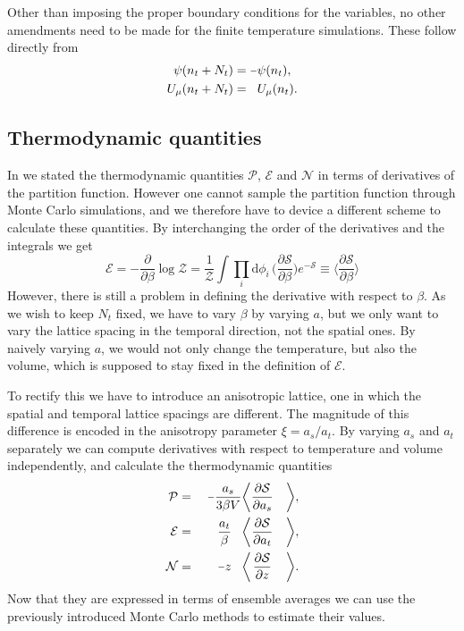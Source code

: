 Other than imposing the proper boundary conditions for the variables, no other
amendments need to be made for the finite temperature simulations. These follow
directly from 
%
\begin{align}
  \psi(n_t + N_t) &= \minus \psi(n_t), \\
  U_{\mu}(n_t + N_t) &= \hphantom{\minus} U_{\mu}(n_t).
\end{align}

\subsection{Thermodynamic quantities}

In  we stated the thermodynamic quantities $\mathcal{P}$,
$\mathcal{E}$ and $\mathcal{N}$ in terms of derivatives of the partition
function. However one cannot sample the partition function through Monte Carlo
simulations, and we therefore have to device a different scheme to calculate
these quantities. By interchanging the order of the derivatives and the
integrals we get 
%
\begin{equation}
  \mathcal{E} = \minus\frac{\partial}{\partial \beta} \log \mathcal{Z}
    = \frac{1}{\mathcal{Z}} \int \prod_i \mathrm{d} \phi_i \, 
    \bigg( \frac{\partial\mathcal{S}}{\partial \beta} \bigg) e^{-\mathcal{S}}
    \equiv \bigg\langle \frac{\partial\mathcal{S}}{\partial \beta} \bigg\rangle
\end{equation}
%
However, there is still a problem in defining the derivative with respect to
$\beta$. As we wish to keep $N_t$ fixed, we have to vary $\beta$ by varying $a$,
but we only want to vary the lattice spacing in the temporal direction, not the
spatial ones. By naively varying $a$, we would not only change the temperature,
but also the volume, which is supposed to stay fixed in the definition of
$\mathcal{E}$.

To rectify this we have to introduce an anisotropic lattice, one in which the
spatial and temporal lattice spacings are different. The magnitude of this
difference is encoded in the anisotropy parameter $\xi = a_s / a_t$. By varying
$a_s$ and $a_t$ separately we can compute derivatives with respect to
temperature and volume independently, and calculate the thermodynamic quantities
%
\begin{alignat}{99}
  \mathcal{P} &{}={}& \centermathcell{\minus\frac{a_s}{3 \beta V}} \bigg\langle &
    \centermathcell{\frac{\partial \mathcal{S}}{\partial a_s}} &\bigg\rangle, \\
  \mathcal{E} &{}={}& \centermathcell{\frac{a_t}{\beta}} \bigg\langle &
    \centermathcell{\frac{\partial \mathcal{S}}{\partial a_t}} &\bigg\rangle, \\
  \mathcal{N} &{}={}& \centermathcell{\minus{}z} \bigg\langle & 
    \centermathcell{\frac{\partial \mathcal{S}}{\partial z}} &\bigg\rangle.
\end{alignat}
%
Now that they are expressed in terms of ensemble averages we can use the
previously introduced Monte Carlo methods to estimate their values.

